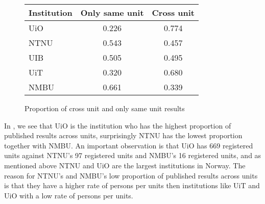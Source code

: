 \begin{figure}[h]
	\centering
	\begin{tabular}{| l || c | c |}
		\hline
		Institution	& Only same unit	& Cross unit	\\ \hline
		UiO		& 0.226			& 0.774		\\
		NTNU		& 0.543			& 0.457		\\
		UIB		& 0.505			& 0.495		\\
		UiT		& 0.320			& 0.680		\\
		NMBU		& 0.661			& 0.339		\\
		\hline
	\end{tabular}
	\caption{Proportion of cross unit and only same unit results}
	\label{tab:unit-proportion}
\end{figure}

In , we see that UiO is the institution who has the highest proportion of published results across units, surprisingly NTNU has the lowest proportion together with NMBU. An important observation is that UiO has 669 registered units against NTNU's 97 registered units and NMBU's 16 registered units, and as mentioned above NTNU and UiO are the largest institutions in Norway. The reason for NTNU's and NMBU's low proportion of published results across units is that they have a higher rate of persons per units then institutions like UiT and UiO with a low rate of persons per units.

